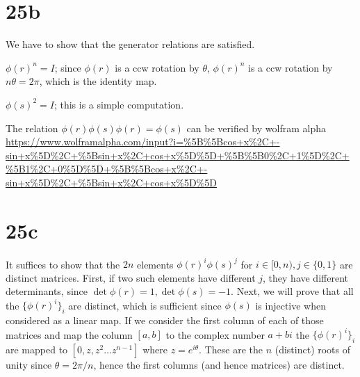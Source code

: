 \documentclass{article}
\begin{document}
\section*{25b}

We have to show that the generator relations are satisfied.

$\phi(r)^n = I$; since $\phi(r)$ is a ccw rotation by $\theta$, $\phi(r)^n$ is a ccw rotation by $n\theta = 2\pi$, which is the identity map.

$\phi(s)^2 = I$; this is a simple computation.

The relation $\phi(r)\phi(s)\phi(r) = \phi(s)$ can be verified by wolfram alpha \url{https://www.wolframalpha.com/input?i=%5B%5Bcos+x%2C+-sin+x%5D%2C+%5Bsin+x%2C+cos+x%5D%5D+%5B%5B0%2C+1%5D%2C+%5B1%2C+0%5D%5D+%5B%5Bcos+x%2C+-sin+x%5D%2C+%5Bsin+x%2C+cos+x%5D%5D}

\section*{25c}

It suffices to show that the $2n$ elements $\phi(r)^i \phi(s)^j$ for $i \in [0, n), j \in \{0, 1\}$ are distinct matrices. First, if two such elements have different $j$, they have different determinants, since $\det \phi(r) = 1, \det \phi(s) = -1$. Next, we will prove that all the $\{\phi(r)^i\}_i$ are distinct, which is sufficient since $\phi(s)$ is injective when considered as a linear map. If we consider the first column of each of those matrices and map the column $[a, b]$ to the complex number $a + bi$ the $\{\phi(r)^i\}_i$ are mapped to $[0, z, z^2 \ldots z^{n-1}]$ where $z = e^{i\theta}$. These are the $n$ (distinct) roots of unity since $\theta = 2\pi/n$, hence the first columns (and hence matrices) are distinct.
\end{document}
